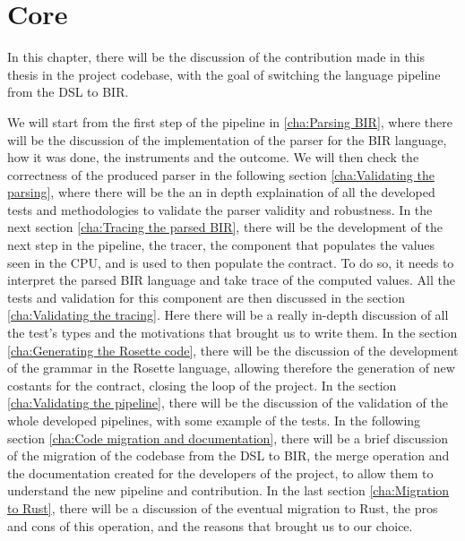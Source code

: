 \chapter{Core}
\label{cha:core} In this chapter, there will be the discussion of the
contribution made in this thesis in the project codebase, with the goal of switching
the language pipeline from the DSL to BIR.

We will start from the first step of the pipeline in \ref{cha:Parsing BIR},
where there will be the discussion of the implementation of the parser for the
BIR language, how it was done, the instruments and the outcome. We will then check
the correctness of the produced parser in the following section \ref{cha:Validating
the parsing}, where there will be the an in depth explaination of all the
developed tests and methodologies to validate the parser validity and robustness.
In the next section \ref{cha:Tracing the parsed BIR}, there will be the
development of the next step in the pipeline, the tracer, the component that
populates the values seen in the CPU, and is used to then populate the contract.
To do so, it needs to interpret the parsed BIR language and take trace of the computed
values. All the tests and validation for this component are then discussed in
the section \ref{cha:Validating the tracing}. Here there will be a really in-depth
discussion of all the test's types and the motivations that brought us to write them.
In the section \ref{cha:Generating the Rosette code}, there will be the discussion
of the development of the grammar in the Rosette language, allowing therefore
the generation of new costants for the contract, closing the loop of the project.
In the section \ref{cha:Validating the pipeline}, there will be the discussion of
the validation of the whole developed pipelines, with some example of the tests.
In the following section \ref{cha:Code migration and documentation}, there will
be a brief discussion of the migration of the codebase from the DSL to BIR, the merge
operation and the documentation created for the developers of the project, to
allow them to understand the new pipeline and contribution. In the last section \ref{cha:Migration
to Rust}, there will be a discussion of the eventual migration to Rust, the pros
and cons of this operation, and the reasons that brought us to our choice.

